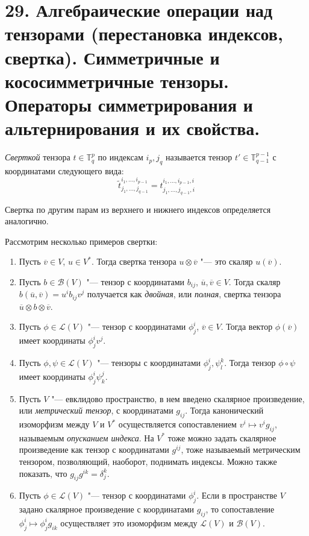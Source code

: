 \section{29. Алгебраические операции над тензорами (перестановка индексов, свертка). Симметричные и кососимметричные тензоры. Операторы симметрирования и альтернирования и их свойства.}

\begin{definition}
	\textit{Сверткой} тензора $t \in \mathbb{T}^p_q$ по индексам $i_p, j_q$ называется тензор $t' \in \mathbb T^{p-1}_{q-1}$ с координатами следующего вида:
	\[\widetilde t^{i_1, \dots, i_{p-1}}_{j_1, \dots, j_{q-1}} = t^{i_1, \dots, i_{p - 1}, i}_{j_1, \dots, j_{q-1}, i}\]
	
	Свертка по другим парам из верхнего и нижнего индексов определяется аналогично.
\end{definition}

\begin{example}
	Рассмотрим несколько примеров свертки:
	\begin{enumerate}
		\item Пусть $\overline{v} \in V$, $u \in V^*$. Тогда свертка тензора $u \otimes \overline{v}$ "--- это скаляр $u(\overline{v})$.
		\item Пусть $b \in \mathcal{B}(V)$ "--- тензор с координатами $b_{ij}$, $\overline{u}, \overline{v} \in V$. Тогда скаляр $b(\overline{u}, \overline{v}) = u^ib_{ij}v^j$ получается как \textit{двойная}, или \textit{полная}, свертка тензора $\overline{u} \otimes b \otimes \overline{v}$.
		\item Пусть $\phi \in \mathcal{L}(V)$ "--- тензор с координатами $\phi^i_j$, $\overline{v} \in V$. Тогда вектор $\phi(\overline{v})$ имеет координаты $\phi^i_jv^j$.
		\item Пусть $\phi, \psi \in \mathcal{L}(V)$ "--- тензоры с координатами $\phi^i_j, \psi^k_l$. Тогда тензор $\phi \circ \psi$ имеет координаты $\phi^i_j\psi^j_k$.
		\item Пусть $V$ "--- евклидово пространство, в нем введено скалярное произведение, или \textit{метрический тензор}, с координатами $g_{ij}$. Тогда канонический изоморфизм между $V$ и $V^*$ осуществляется сопоставлением $v^i \mapsto v^ig_{ij}$, называемым \textit{опусканием индекса}. На $V^*$ тоже можно задать скалярное произведение как тензор с координатами $g^{ij}$, тоже называемый метрическим тензором, позволяющий, наоборот, поднимать индексы. Можно также показать, что $g_{ij}g^{ik} = \delta^k_j$.
		\item Пусть $\phi \in \mathcal{L}(V)$ "--- тензор с координатами $\phi^i_j$. Если в пространстве $V$ задано скалярное произведение с координатами $g_{ij}$, то сопоставление $\phi^i_j \mapsto \phi^i_jg_{ik}$ осуществляет это изоморфизм между $\mathcal{L}(V)$ и $\mathcal{B}(V)$.
	\end{enumerate}
\end{example}


